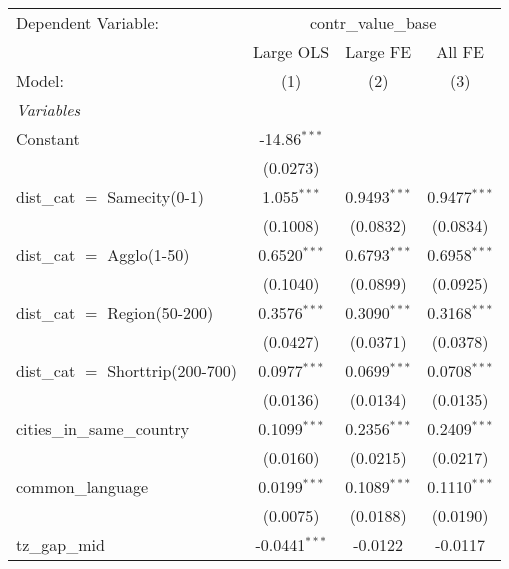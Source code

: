 
\begingroup
\centering
\begin{tabular}{lccc}
   \tabularnewline \midrule \midrule
   Dependent Variable: & \multicolumn{3}{c}{contr\_value\_base}\\
                                                  & Large OLS       & Large FE        & All FE \\   
   Model:                                         & (1)             & (2)             & (3)\\  
   \midrule
   \emph{Variables}\\
   Constant                                       & -14.86$^{***}$  &                 &   \\   
                                                  & (0.0273)        &                 &   \\   
   dist\_cat $=$ Samecity(0-1)                    & 1.055$^{***}$   & 0.9493$^{***}$  & 0.9477$^{***}$\\   
                                                  & (0.1008)        & (0.0832)        & (0.0834)\\   
   dist\_cat $=$ Agglo(1-50)                      & 0.6520$^{***}$  & 0.6793$^{***}$  & 0.6958$^{***}$\\   
                                                  & (0.1040)        & (0.0899)        & (0.0925)\\   
   dist\_cat $=$ Region(50-200)                   & 0.3576$^{***}$  & 0.3090$^{***}$  & 0.3168$^{***}$\\   
                                                  & (0.0427)        & (0.0371)        & (0.0378)\\   
   dist\_cat $=$ Shorttrip(200-700)               & 0.0977$^{***}$  & 0.0699$^{***}$  & 0.0708$^{***}$\\   
                                                  & (0.0136)        & (0.0134)        & (0.0135)\\   
   cities\_in\_same\_country                      & 0.1099$^{***}$  & 0.2356$^{***}$  & 0.2409$^{***}$\\   
                                                  & (0.0160)        & (0.0215)        & (0.0217)\\   
   common\_language                               & 0.0199$^{***}$  & 0.1089$^{***}$  & 0.1110$^{***}$\\   
                                                  & (0.0075)        & (0.0188)        & (0.0190)\\   
   tz\_gap\_mid                                   & -0.0441$^{***}$ & -0.0122         & -0.0117\\   

\end{tabular}
